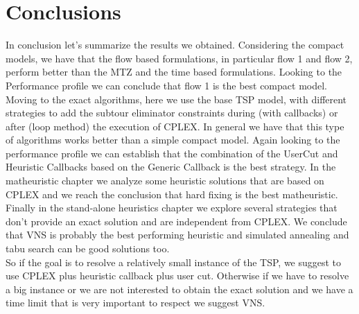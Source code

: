 \chapter{Conclusions}
In conclusion let's summarize the results we obtained. Considering the compact models, we have that the flow based formulations, in particular flow 1 and flow 2, perform better than the MTZ and the time based formulations. Looking to the Performance profile we can conclude that flow 1 is the best compact model.
Moving to the exact algorithms, here we use the base TSP model, with different strategies to add the subtour eliminator constraints during (with callbacks) or after (loop method) the execution of CPLEX. In general we have that this type of algorithms works better than a simple compact model. Again looking to the performance profile we can establish that the combination of the UserCut and Heuristic Callbacks based on the Generic Callback is the best strategy.
In the matheuristic chapter we analyze some heuristic solutions that are based on CPLEX and we reach the conclusion that hard fixing is the best matheuristic.
Finally in the stand-alone heuristics chapter we explore several strategies that don't provide an exact solution and are independent from CPLEX. We conclude that VNS is probably the best performing heuristic and simulated annealing and tabu search can be good solutions too. \\

\noindent So if the goal is to resolve a relatively small instance of the TSP, we suggest to use CPLEX plus heuristic callback plus user cut. Otherwise if we have to resolve a big instance or we are not interested to obtain the exact solution and we have a time limit that is very important to respect we suggest VNS. 




